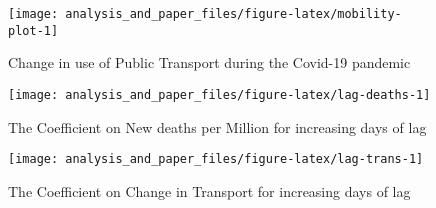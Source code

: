 \documentclass[
  12pt,
]{article}
\begin{document}
\begin{figure}
\texttt{[image: analysis\_and\_paper\_files/figure-latex/mobility-plot-1]} \caption{Change in use of Public Transport during the Covid-19 pandemic}\label{fig:mobility-plot}
\end{figure}

\begin{figure}
\texttt{[image: analysis\_and\_paper\_files/figure-latex/lag-deaths-1]} \caption{The Coefficient on New deaths per Million for increasing days of lag}\label{fig:lag-deaths}
\end{figure}

\begin{figure}
\texttt{[image: analysis\_and\_paper\_files/figure-latex/lag-trans-1]} \caption{The Coefficient on Change in Transport for increasing days of lag}\label{fig:lag-trans}
\end{figure}
\end{document}
